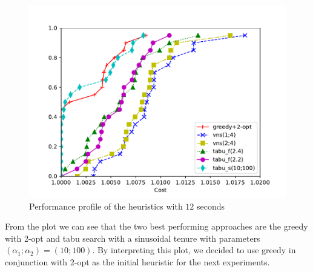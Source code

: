 \documentclass{article}
\begin{document}
\begin{figure}[ht]
        \caption{Performance profile of the heuristics with $12$ seconds}
        \label{fig:ht_best12}
        \centering
        \includegraphics[width=340pt]{assets/ht_best12.pdf}
\end{figure}

From the plot we can see that the two best performing approaches are the greedy
with 2-opt and tabu search with a sinusoidal tenure with parameters
$\left(\alpha_1; \alpha_2\right) = \left(10;100\right)$.
By interpreting this plot, we decided to use greedy in conjunction with 2-opt
as the initial heuristic for the next experiments.


\clearpage
\newpage



\end{document}
